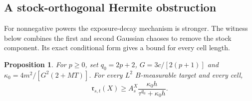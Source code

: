\documentclass[11pt,a4paper]{amsart}
\theoremstyle{plain}
\newtheorem{proposition}[theorem]{Proposition}
\theoremstyle{definition}
\theoremstyle{remark}
\begin{document}
\subsection{A stock-orthogonal Hermite obstruction}
For nonnegative powers the exposure-decay mechanism is stronger. The witness below combines the first and second Gaussian chaoses to remove the stock component. Its exact conditional form gives a bound for every cell length.

\begin{proposition}\label{prop:hermite}
For $p\ge0$, set $q_0=2p+2$, $G=3c/[2(p+1)]$ and
$\kappa_0=4m^2/[G^2(2+MT)]$. For every $L^2$ $B$-measurable target and every cell,
\begin{equation}\label{eq:hermite-residual}
 \mathfrak r_{s,t}(X)\ge
 A_s^X\frac{\kappa_0 h}{\tau^{q_0}+\kappa_0 h}.
\end{equation}
\end{proposition}
\end{document}
